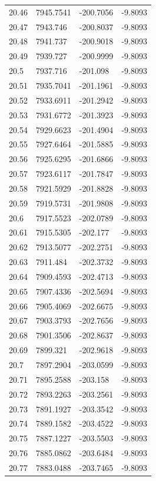 \begin{table}[H]
\begin{tabular}{llll}
20.46 & 7945.7541 & -200.7056 & -9.8093 \\
20.47 & 7943.746 & -200.8037 & -9.8093 \\
20.48 & 7941.737 & -200.9018 & -9.8093 \\
20.49 & 7939.727 & -200.9999 & -9.8093 \\
20.5 & 7937.716 & -201.098 & -9.8093 \\
20.51 & 7935.7041 & -201.1961 & -9.8093 \\
20.52 & 7933.6911 & -201.2942 & -9.8093 \\
20.53 & 7931.6772 & -201.3923 & -9.8093 \\
20.54 & 7929.6623 & -201.4904 & -9.8093 \\
20.55 & 7927.6464 & -201.5885 & -9.8093 \\
20.56 & 7925.6295 & -201.6866 & -9.8093 \\
20.57 & 7923.6117 & -201.7847 & -9.8093 \\
20.58 & 7921.5929 & -201.8828 & -9.8093 \\
20.59 & 7919.5731 & -201.9808 & -9.8093 \\
20.6 & 7917.5523 & -202.0789 & -9.8093 \\
20.61 & 7915.5305 & -202.177 & -9.8093 \\
20.62 & 7913.5077 & -202.2751 & -9.8093 \\
20.63 & 7911.484 & -202.3732 & -9.8093 \\
20.64 & 7909.4593 & -202.4713 & -9.8093 \\
20.65 & 7907.4336 & -202.5694 & -9.8093 \\
20.66 & 7905.4069 & -202.6675 & -9.8093 \\
20.67 & 7903.3793 & -202.7656 & -9.8093 \\
20.68 & 7901.3506 & -202.8637 & -9.8093 \\
20.69 & 7899.321 & -202.9618 & -9.8093 \\
20.7 & 7897.2904 & -203.0599 & -9.8093 \\
20.71 & 7895.2588 & -203.158 & -9.8093 \\
20.72 & 7893.2263 & -203.2561 & -9.8093 \\
20.73 & 7891.1927 & -203.3542 & -9.8093 \\
20.74 & 7889.1582 & -203.4522 & -9.8093 \\
20.75 & 7887.1227 & -203.5503 & -9.8093 \\
20.76 & 7885.0862 & -203.6484 & -9.8093 \\
20.77 & 7883.0488 & -203.7465 & -9.8093 \\

\end{tabular}
\end{table}
